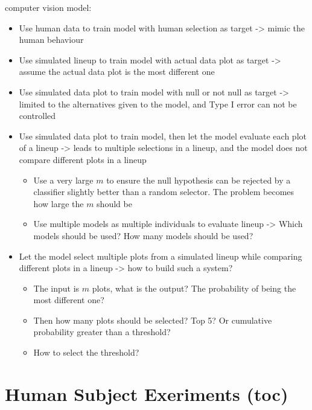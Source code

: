 \documentclass{monashthesis}
\begin{document}
computer vision model:

\begin{itemize}
\tightlist
\item
  Use human data to train model with human selection as target -\textgreater{} mimic the human behaviour
\item
  Use simulated lineup to train model with actual data plot as target -\textgreater{} assume the actual data plot is the most different one
\item
  Use simulated data plot to train model with null or not null as target -\textgreater{} limited to the alternatives given to the model, and Type I error can not be controlled
\item
  Use simulated data plot to train model, then let the model evaluate each plot of a lineup -\textgreater{} leads to multiple selections in a lineup, and the model does not compare different plots in a lineup

  \begin{itemize}
  \tightlist
  \item
    Use a very large \(m\) to ensure the null hypothesis can be rejected by a classifier slightly better than a random selector. The problem becomes how large the \(m\) should be
  \item
    Use multiple models as multiple individuals to evaluate lineup -\textgreater{} Which models should be used? How many models should be used?
  \end{itemize}
\item
  Let the model select multiple plots from a simulated lineup while comparing different plots in a lineup -\textgreater{} how to build such a system?

  \begin{itemize}
  \tightlist
  \item
    The input is \(m\) plots, what is the output? The probability of being the most different one?
  \item
    Then how many plots should be selected? Top 5? Or cumulative probability greater than a threshold?
  \item
    How to select the threshold?
  \end{itemize}
\end{itemize}

\hypertarget{human-subject-exeriments-toc}{%
\chapter{Human Subject Exeriments (toc)}\label{human-subject-exeriments-toc}}
\end{document}
